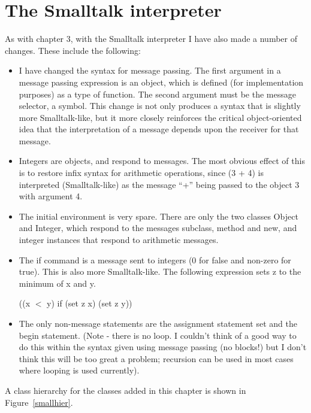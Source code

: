 \chapter{The Smalltalk interpreter}

As with chapter 3, with the Smalltalk interpreter I have also made a number
of changes.  These include the following:

\begin{itemize}
\item
I have changed the syntax for message passing.
The first argument in a message
passing expression is an object, which is defined (for implementation
purposes) as a type of function.  The second argument must be the message
selector, a symbol.  This change is not only produces a syntax that is
slightly more Smalltalk-like, but it more closely reinforces the critical
object-oriented idea that the interpretation of a message depends upon the
receiver for that message.
\item
Integers are objects, and respond to messages.  The most obvious effect of
this is to restore infix syntax for arithmetic operations, since (3 + 4) is
interpreted (Smalltalk-like) as the message ``+'' being passed to the
object 3 with argument 4.
\item
The initial environment is very spare.  There are only the two classes
{\sf Object} and {\sf Integer}, which respond to the messages 
{\sf subclass}, {\sf method} and {\sf new}, and integer instances that respond
to arithmetic messages.
\item
The {\sf if} command is a message sent to integers (0 for false and
non-zero for true).  This is also more Smalltalk-like.  The following
expression sets {\sf z} to the minimum of {\sf x} and {\sf y}.
\begin{center}
{\sf ((x $<$ y) if (set z x) (set z y))}
\end{center}
\item
The only non-message statements are the assignment statement {\sf set} and
the {\sf begin} statement.  (Note - there is no loop.  I couldn't think of
a good way to do this within the syntax given using message passing (no
blocks!) but I don't think this will be too great a problem; recursion can
be used in most cases where looping is used currently).
\end{itemize}

A class hierarchy for the classes added in this chapter is shown in
Figure~\ref{smallhier}.


